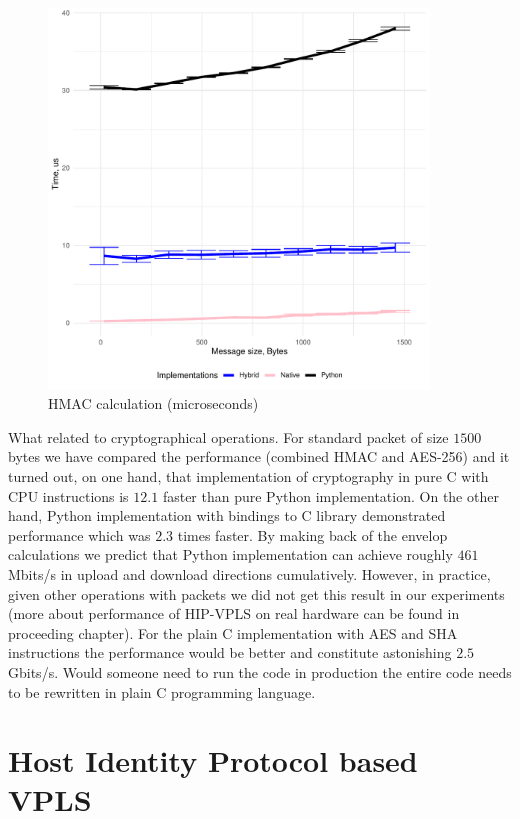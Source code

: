 \begin{figure}[h!]
    \centering
    \includegraphics[width=0.9\textwidth]{graphics/crypto/hmac.pdf}
    \caption{HMAC calculation (microseconds)}
    \label{fig:aes}
\end{figure}


What related to cryptographical operations. For standard packet of size $1500$ 
bytes we have compared the performance (combined HMAC and AES-256) and it turned 
out, on one hand, that implementation of cryptography in pure C with CPU instructions is 
$12.1$ faster than pure Python implementation. On the other hand, Python implementation with bindings
to C library demonstrated performance which was $2.3$ times faster. By making back of the envelop calculations
we predict that Python implementation can achieve roughly $461$ Mbits/s in upload and download directions
cumulatively. However, in practice, given other operations with packets we did not get this result 
in our experiments (more about performance of HIP-VPLS on real hardware can be found in proceeding 
chapter). For the plain C implementation with AES and SHA instructions the performance would be 
better and constitute astonishing $2.5$ Gbits/s. Would someone need to run the code in production
the entire code needs to be rewritten in plain C programming language.

\section{Host Identity Protocol based VPLS}

